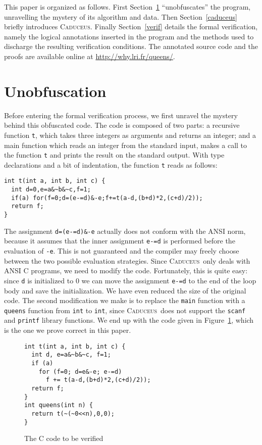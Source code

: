 \documentclass[a4paper]{llncs}
\newcommand{\caduceus}{\textsc{Caduceus}}
\begin{document}
This paper is organized as follows. First Section~\ref{unobf}
``unobfuscates'' the program, unravelling the mystery of its algorithm
and data. Then Section~\ref{caduceus} briefly introduces \caduceus.
Finally Section~\ref{verif} details the formal verification,
namely the logical annotations inserted in the program
and the methods used to discharge the resulting verification conditions.
The annotated source code and the proofs are available online at
\url{http://why.lri.fr/queens/}.


\section{Unobfuscation}\label{unobf}

Before entering the formal verification process, we first unravel the
mystery behind this obfuscated code. The code is composed of two
parts: a recursive function \texttt{t}, which takes three integers as
arguments and returns an integer; and a main function which reads an
integer from the standard input, makes a call to the function
\texttt{t} and prints the result on the standard output.
With type declarations and a bit of indentation, the function
\texttt{t} reads as follows:
\begin{verbatim}
int t(int a, int b, int c) {
  int d=0,e=a&~b&~c,f=1;
  if(a) for(f=0;d=(e-=d)&-e;f+=t(a-d,(b+d)*2,(c+d)/2));
  return f;
}
\end{verbatim}
The assignment \verb!d=(e-=d)&-e! actually does not conform with the
ANSI norm, because it assumes that the inner assignment \verb!e-=d! is
performed before the evaluation of \verb!-e!. This is not guaranteed
and the compiler may freely choose between the two possible evaluation
strategies. Since \caduceus\ only deals with ANSI C programs,
we need to modify the code. Fortunately, this is quite easy:
since \verb!d! is initialized to 0 we can move the
assignment \verb!e-=d! to the end of the loop body and save the
initialization. We have even reduced the size of the original code.
The second modification we make is to replace the \texttt{main}
function with a \texttt{queens} function from \texttt{int} to
\texttt{int}, since \caduceus\ does not support the \texttt{scanf} and
\texttt{printf} library functions.
We end up with the code given in Figure~\ref{fig:code}, which is the
one we prove correct in this paper.
\begin{figure}[t]
  \centering\hrulefill\vspace{-1em}
\begin{verbatim}
int t(int a, int b, int c) {
  int d, e=a&~b&~c, f=1;
  if (a)
    for (f=0; d=e&-e; e-=d)
      f += t(a-d,(b+d)*2,(c+d)/2));
  return f;
}
int queens(int n) {
  return t(~(~0<<n),0,0);
}
\end{verbatim}  
\vspace{-1.2em}\hrulefill\vspace{-1em}
  \caption{The C code to be verified}
  \label{fig:code}
\end{figure}
\end{document}
